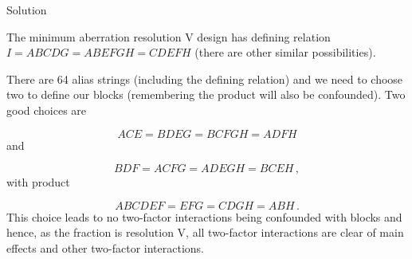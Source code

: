 \documentclass[
]{book}
\theoremstyle{definition}
\theoremstyle{definition}
\theoremstyle{definition}
\theoremstyle{definition}
\theoremstyle{remark}
\begin{document}
Solution

The minimum aberration resolution V design has defining relation \(I = ABCDG = ABEFGH = CDEFH\) (there are other similar possibilities).

There are 64 alias strings (including the defining relation) and we need to choose two to define our blocks (remembering the product will also be confounded). Two good choices are

\[
ACE = BDEG = BCFGH = ADFH
\]
and

\[
BDF = ACFG = ADEGH = BCEH\,,
\]
with product

\[
ABCDEF = EFG = CDGH = ABH\,.
\]
This choice leads to no two-factor interactions being confounded with blocks and hence, as the fraction is resolution V, all two-factor interactions are clear of main effects and other two-factor interactions.

  
\end{document}
